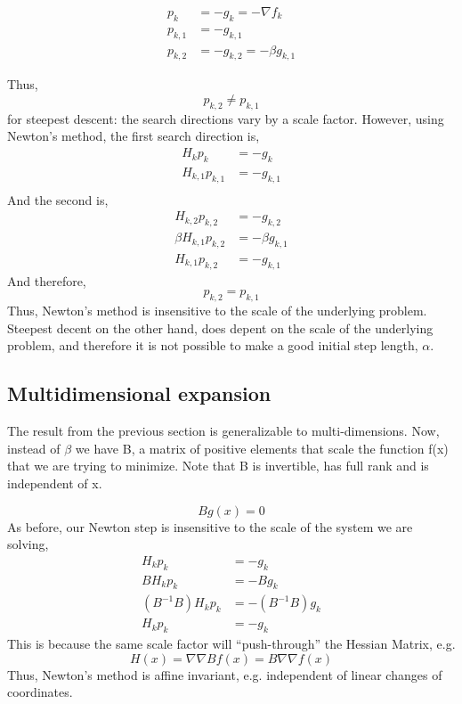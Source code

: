 \documentclass{article}
\begin{document}
\begin{align*}
 p_k&=-g_k = -\nabla f_k\\
 p_{k,1}&=-g_{k,1}\\
 p_{k,2}&=-g_{k,2} = -\beta g_{k,1}
\end{align*}

Thus, 
\begin{equation}
p_{k,2} \ne p_{k,1}
\end{equation}
for steepest descent: the search directions
vary by a scale factor. However, using Newton's method, the first search
direction is,
\begin{align*}
 H_k p_k&=-g_k \\
 H_{k,1} p_{k,1}&=-g_{k,1}\\
\end{align*}
And the second is,
\begin{align*}
 H_{k,2} p_{k,2}&=-g_{k,2}\\
 \beta H_{k,1} p_{k,2}&=- \beta g_{k,1}\\
 H_{k,1} p_{k,2}&=-g_{k,1}
\end{align*}
And therefore, 
\begin{equation}
p_{k,2} = p_{k,1}
\end{equation}
Thus, Newton's method is insensitive to the scale of the underlying
problem. Steepest decent on the other hand, does depent on the scale of
the underlying problem, and therefore it is not possible to make a good
initial step length, $\alpha$.

\subsection{Multidimensional expansion}

The result from the previous section is generalizable to
multi-dimensions. Now, instead of $\beta$ we have B, a matrix of
positive elements that scale the function f(x) that we are trying to
minimize. Note that B is invertible, has full rank and is independent of
x. 

\begin{equation}
 Bg(x) = 0
\end{equation}
As before, our Newton step is insensitive to the scale of the system we
are solving, 
\begin{align*}
 H_{k} p_{k}&=-g_{k}\\
 B H_{k} p_{k}&=- B g_{k}\\
 (B^{-1}B)H_{k} p_{k}&=-(B^{-1}B)g_{k} \\
 H_{k} p_{k}&=-g_{k}
\end{align*}
This is because the same scale factor will ``push-through'' the Hessian
Matrix, e.g. 
\begin{equation}
H(x) = \nabla\nabla B f(x) = B \nabla\nabla f(x) 
\end{equation}
Thus, Newton's method is affine invariant, e.g. independent of linear
changes of coordinates. 
\end{document}
